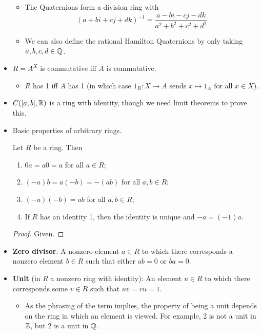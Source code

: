 \documentclass[../notes.tex]{subfiles}
\begin{document}
\begin{itemize}
\begin{itemize}
\begin{itemize}
        \end{itemize}
        \item The Quaternions form a division ring with
        \begin{equation*}
            (a+bi+cj+dk)^{-1} = \frac{a-bi-cj-dk}{a^2+b^2+c^2+d^2}
        \end{equation*}
        \item We can also define the rational Hamilton Quaternions by only taking $a,b,c,d\in\mathbb{Q}$.
    \end{itemize}
    \item $R=A^X$ is commutative iff $A$ is commutative.
    \begin{itemize}
        \item $R$ has 1 iff $A$ has 1 (in which case $1_R:X\to A$ sends $x\mapsto 1_A$ for all $x\in X$).
    \end{itemize}
    \item $C([a,b],\mathbb{R})$ is a ring with identity, though we need limit theorems to prove this.
    \item Basic properties of arbitrary rings.
    \begin{proposition}\label{prp:7.1}
        Let $R$ be a ring. Then
        \begin{enumerate}
            \item $0a=a0=a$ for all $a\in R$;
            \item $(-a)b=a(-b)=-(ab)$ for all $a,b\in R$;
            \item $(-a)(-b)=ab$ for all $a,b\in R$;
            \item If $R$ has an identity 1, then the identity is unique and $-a=(-1)a$.
        \end{enumerate}
        \begin{proof}
            Given.
        \end{proof}
    \end{proposition}
    \item \textbf{Zero divisor}: A nonzero element $a\in R$ to which there corresponds a nonzero element $b\in R$ such that either $ab=0$ or $ba=0$.
    \item \textbf{Unit} (in $R$ a nonzero ring with identity): An element $u\in R$ to which there corresponds some $v\in R$ such that $uv=vu=1$.
    \begin{itemize}
        \item As the phrasing of the term implies, the property of being a unit depends on the ring in which an element is viewed. For example, 2 is not a unit in $\mathbb{Z}$, but 2 is a unit in $\mathbb{Q}$.

\end{itemize}
\end{itemize}
\end{document}

